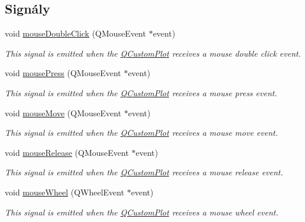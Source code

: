 \subsection*{Signály}
\begin{DoxyCompactItemize}
\item 
\hypertarget{classQCustomPlot_a9b232142c64fcf273a953ee08e5b90e9}{}void \hyperlink{classQCustomPlot_a9b232142c64fcf273a953ee08e5b90e9}{mouse\+Double\+Click} (Q\+Mouse\+Event $\ast$event)\label{classQCustomPlot_a9b232142c64fcf273a953ee08e5b90e9}

\begin{DoxyCompactList}\small\item\em This signal is emitted when the \hyperlink{classQCustomPlot}{Q\+Custom\+Plot} receives a mouse double click event. \end{DoxyCompactList}\item 
void \hyperlink{classQCustomPlot_aca75bf9afb5dd19349c375de2a87a051}{mouse\+Press} (Q\+Mouse\+Event $\ast$event)
\begin{DoxyCompactList}\small\item\em This signal is emitted when the \hyperlink{classQCustomPlot}{Q\+Custom\+Plot} receives a mouse press event. \end{DoxyCompactList}\item 
void \hyperlink{classQCustomPlot_a742ca4f94688bed2a685fd8a56ce5704}{mouse\+Move} (Q\+Mouse\+Event $\ast$event)
\begin{DoxyCompactList}\small\item\em This signal is emitted when the \hyperlink{classQCustomPlot}{Q\+Custom\+Plot} receives a mouse move event. \end{DoxyCompactList}\item 
void \hyperlink{classQCustomPlot_ac8dc0ee6bb98e923c00b4ebafbe6134d}{mouse\+Release} (Q\+Mouse\+Event $\ast$event)
\begin{DoxyCompactList}\small\item\em This signal is emitted when the \hyperlink{classQCustomPlot}{Q\+Custom\+Plot} receives a mouse release event. \end{DoxyCompactList}\item 
void \hyperlink{classQCustomPlot_ac80a14206f99304a91d2aa55775ec3ff}{mouse\+Wheel} (Q\+Wheel\+Event $\ast$event)
\begin{DoxyCompactList}\small\item\em This signal is emitted when the \hyperlink{classQCustomPlot}{Q\+Custom\+Plot} receives a mouse wheel event. \end{DoxyCompactList}\item 

\end{DoxyCompactItemize}
